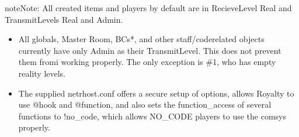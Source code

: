 \documentclass[letterpaper,10pt,english]{sphinxmanual}
\begin{document}
\begin{sphinxadmonition}{note}{Note:}
\sphinxAtStartPar
All created items and players by default are in Recieve\sphinxhyphen{}Level \textquotesingle{}Real\textquotesingle{} and
Transmit\sphinxhyphen{}Levels \textquotesingle{}Real\textquotesingle{} and \textquotesingle{}Admin\textquotesingle{}.
\end{sphinxadmonition}
\begin{itemize}
\item {} 
\sphinxAtStartPar
All globals, Master Room, BCs\sphinxhyphen{}*, and other staff/code\sphinxhyphen{}related objects
currently have only \textquotesingle{}Admin\textquotesingle{} as their Transmit\sphinxhyphen{}Level. This does not prevent
them fromi working properly. The only exception is \#1, who has empty reality
levels.

\item {} 
\sphinxAtStartPar
The supplied netrhost.conf offers a secure setup of options, allows Royalty
to use @hook and @function, and also sets the function\_access of several
functions to !no\_code, which allows NO\_CODE players to use the comsys
properly.

\end{itemize}
\end{document}
